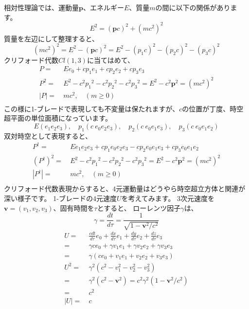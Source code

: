\documentclass[a4paper,12pt,notitlepage]{jsreport}
\begin{document}
相対性理論では、運動量$\bm{p}$、エネルギー$E$、質量$m$の間に以下の関係があります。
\begin{equation}
  E^2=(\bm{p}c)^2+(mc^2)^2
\end{equation}
質量を左辺にして整理すると、
\begin{equation}
  (mc^2)^2=E^2-(\bm{p}c)^2=E^2-(p_1c)^2-(p_2c)^2-(p_3c)^2
\end{equation}
クリフォード代数$Cl(1,3)$に当てはめて、
\begin{equation}
  \begin{split}
    P = ~ & E e_0 + c p_1 e_1 + c p_2 e_2 + c p_3 e_3 \\
    P^2 = ~ & E^2 - c^2 {p_1}^2 - c^2 {p_2}^2 - c^2 {p_3}^2 = E^2 - c^2 \bm{p}^2 = (m c^2)^2 \\
    |P| = ~ & m c^2, \quad (m \ge 0) \\
  \end{split}
\end{equation}
この様に1-ブレードで表現しても不変量は保たれますが、$ c $の位置が丁度、時空超平面の単位面積になっています。
\begin{equation}
  E (e_1e_2e_3), \quad p_1 (c ~ e_0e_2e_3), \quad p_2 (c ~ e_0e_1e_3), \quad p_3 (c ~ e_0e_1e_2)
\end{equation}
双対時空として表現すると、
\begin{equation}
  \begin{split}
    P^\dag = ~ & E e_1e_2e_3 + c p_1 e_0e_2e_3 - c p_2 e_0e_1e_3 + c p_3 e_0e_1e_2 \\
    (P^\dag)^2 = ~ & E^2 - c^2 {p_1}^2 - c^2 {p_2}^2 - c^2 {p_3}^2 = E^2 - c^2 \bm{p}^2 = (m c^2)^2 \\
    |P^\dag| = ~ & m c^2, \quad (m \ge 0) \\
  \end{split}
\end{equation}
クリフォード代数表現からすると、4元運動量はどうやら時空超立方体と関連が深い様子です。
1-ブレードの4元速度$ U $を考えてみます。
3次元速度を$ \bm{v} = (v_1, v_2, v_3) $、固有時間を$ \tau $とすると、
ローレンツ因子$ \gamma $は、
\begin{equation}
  \gamma = \frac{dt}{d\tau} = \frac{1}{\sqrt{1 - \bm{v}^2 / c^2}}
\end{equation}
\begin{equation}
  \begin{split}
    U = ~ & \frac{c dt}{d\tau} e_0 + \frac{dx}{d\tau} e_1 + \frac{dy}{d\tau} e_2 + \frac{dz}{d\tau} e_3 \\
    = ~ & \gamma c e_0 + \gamma v_1 e_1 + \gamma v_2 e_2 + \gamma v_3 e_3 \\
    = ~ & \gamma (c e_0 + v_1 e_1 + v_2 e_2 + v_3 e_3) \\
    U^2 = ~ & \gamma^2 (c^2 - v_1^2 - v_2^2 - v_3^2) \\
    = ~ & \gamma^2 (c^2 - \bm{v}^2) = c^2 \gamma^2 (1 - \bm{v}^2 / c^2) \\
    = ~ & c^2 \\
    |U| = ~ & c \\
  \end{split}
\end{equation}
\end{document}

